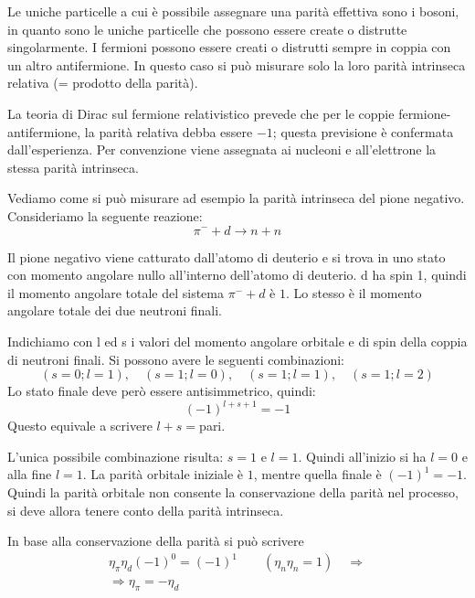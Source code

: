 Le uniche particelle a cui è possibile assegnare una parità effettiva sono i 
bosoni, in quanto sono le uniche particelle che
possono essere create o distrutte singolarmente. I fermioni possono essere 
creati o distrutti sempre in coppia con un altro
antifermione. In questo caso si può misurare solo la loro parità intrinseca 
relativa (= prodotto della parità).

La teoria di Dirac sul fermione relativistico prevede che per le coppie 
fermione-antifermione, la parità relativa debba essere
$-1$; questa previsione è confermata dall'esperienza. Per convenzione viene 
assegnata ai nucleoni e all'elettrone la stessa
parità intrinseca.

Vediamo come si può misurare ad esempio la parità intrinseca del pione 
negativo. Consideriamo la seguente reazione:
\begin{equation*}
 \pi^- + d \rightarrow n + n
\end{equation*}

Il pione negativo viene catturato dall'atomo di deuterio e si trova in uno 
stato con momento angolare nullo all'interno
dell'atomo di deuterio. d ha spin 1, quindi il momento angolare totale del 
sistema $\pi^- + d$ è $1$. Lo stesso è il momento
angolare totale dei due neutroni finali.

Indichiamo con l ed s i valori del momento angolare orbitale e di spin della 
coppia di neutroni finali. Si possono avere le
seguenti combinazioni:
\begin{equation*}
 (s=0; l=1),\quad (s=1; l=0), \quad (s=1; l=1), \quad (s=1; l=2)
\end{equation*}
Lo stato finale deve però essere antisimmetrico, quindi:
\begin{equation*}
 (-1)^{l+s+1} = -1
\end{equation*}
Questo equivale a scrivere $l+s=$pari.

L'unica possibile combinazione risulta: $s = 1$ e $l = 1$. Quindi all'inizio si 
ha $l = 0$ e alla fine $l = 1$. La parità orbitale iniziale è $1$, mentre 
quella finale è $(-1)^1 = -1$.
Quindi la parità orbitale non consente la conservazione della parità nel 
processo, si deve allora tenere conto della parità
intrinseca.

In base alla conservazione della parità si può scrivere
\begin{gather*}
 \eta_{\pi} \eta_d (-1)^0 = (-1)^1 \quad\quad (\eta_n \eta_n = 
1)\quad\Rightarrow \\
\Rightarrow \eta_{\pi} = -\eta_d
\end{gather*}


